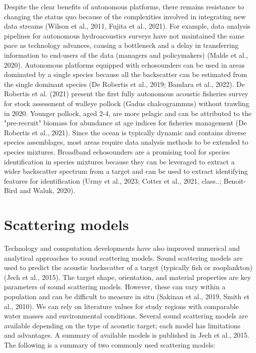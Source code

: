 Despite the clear benefits of autonomous platforms, there remains resistance to changing the status quo because of the complexities involved in integrating new data streams (Wilson et al., 2011, Fujita et al., 2021). For example, data analysis pipelines for autonomous hydroacoustics surveys have not maintained the same pace as technology advances, causing a bottleneck and a delay in transferring information to end-users of the data (managers and policymakers) (Malde et al., 2020). Autonomous platforms equipped with echosounders can be used in areas dominated by a single species because all the backscatter can be estimated from the single dominant species (De Robertis et al., 2019; Bandara et al., 2022). De Robertis et al. (2021) present the first fully autonomous acoustic fisheries survey for stock assessment of walleye pollock (Gadus chalcogrammus) without trawling in 2020. Younger pollock, aged 2-4, are more pelagic and can be attributed to the "pre-recruit" biomass for abundance at age indices for fisheries management (De Robertis et al., 2021).
Since the ocean is typically dynamic and contains diverse species assemblages, most areas require data analysis methods to be extended to species mixtures. Broadband echosounders are a promising tool for species identification in species mixtures because they can be leveraged to extract a wider backscatter spectrum from a target and can be used to extract identifying features for identification (Urmy et al., 2023; Cotter et al., 2021, class..; Benoit-Bird and Waluk, 2020).  
\section{Scattering models}
Technology and computation developments have also improved numerical and analytical approaches to sound scattering models. Sound scattering models are used to predict the acoustic backscatter of a target (typically fish or zooplankton) (Jech et al., 2015). The target shape, orientation, and material properties are key parameters of sound scattering models. However, these can vary within a population and can be difficult to measure in situ (Sakinan et al., 2019, Smith et al., 2010). We can rely on literature values for study regions with comparable water masses and environmental conditions. Several sound scattering models are available depending on the type of acoustic target; each model has limitations and advantages. A summary of available models is published in Jech et al., 2015. The following is a summary of two commonly used scattering models:
